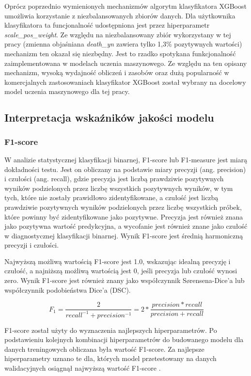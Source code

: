 \documentclass[polish, twoside, 12pt, a4paper]{article}
\theoremstyle{definition}
\theoremstyle{plain}
\theoremstyle{remark}
\begin{document}
Oprócz poprzednio wymienionych mechanizmów algorytm klasyfikatora XGBoost umożliwia korzystanie z niezbalansowanych zbiorów danych. Dla użytkownika klasyfikatora ta funcjonalność udostępniona jest przez hiperparametr \emph{scale\_pos\_weight}. Ze względu na niezbalansowany zbiór wykorzystany w tej pracy (zmienna objaśniana \emph{death\_yn} zawiera tylko 1,3\% pozytywnych wartości) mechanizm ten okazał się niezbędny. Jest to rzadko spotykana funkcjonalność zaimplementowana w modelach uczenia maszynowego. Ze względu na ten opisany mechanizm, wysoką wydajność obliczeń i zasobów oraz dużą popularność w komercjalnych zastosowaniach klasyfikator XGBoost został wybrany na docelowy model uczenia maszynowego dla tej pracy. 

\subsection{Interpretacja wskaźników jakości modelu}

\subsubsection{F1-score}

W analizie statystycznej klasyfikacji binarnej, F1-score lub F1-measure jest miarą dokładności testu. Jest on obliczany na podstawie miary precyzji (ang. precision) i czułości (ang. recall), gdzie precyzja jest liczbą prawdziwie pozytywnych wyników podzielonych przez liczbę wszystkich pozytywnych wyników, w tym tych, które nie zostały prawidłowo zidentyfikowane, a czułość jest liczbą prawdziwie pozytywnych wyników podzielonych przez liczbę wszystkich próbek, które powinny być zidentyfikowane jako pozytywne. Precyzja jest również znana jako pozytywna wartość predykcyjna, a wycofanie jest również znane jako czułość w diagnostycznej klasyfikacji binarnej. Wynik F1-score jest średnią harmoniczną precyzji i czułości. 

Najwyższą możliwą wartością F1-score jest 1.0, wskazując idealną precyzję i czułość, a najniższą możliwą wartością jest 0, jeśli precyzja lub czułość wynosi zero. Wynik F1-score jest również znany jako współczynnik Sørensena-Dice'a lub współczynnik podobieństwa Dice'a (DSC).

\[ F_1 = \frac{2}{recall^{-1} + precision^{-1}} = 2 * \frac{precision * recall}{precision + recall} \]

F1-score został użyty do wyznaczenia najlepszych hiperparametrów. Po podstawieniu kolejnych kombinacji hiperparametrów do budowanego modelu dla danych treningowych obliczana była wartość F1-score. Za najlepsze hiperparametry uznano te dla, których model przetestowany na danych walidacyjnych osiągnął najwyższą wartość F1-score \cite{tharwat2018}.
\end{document}
